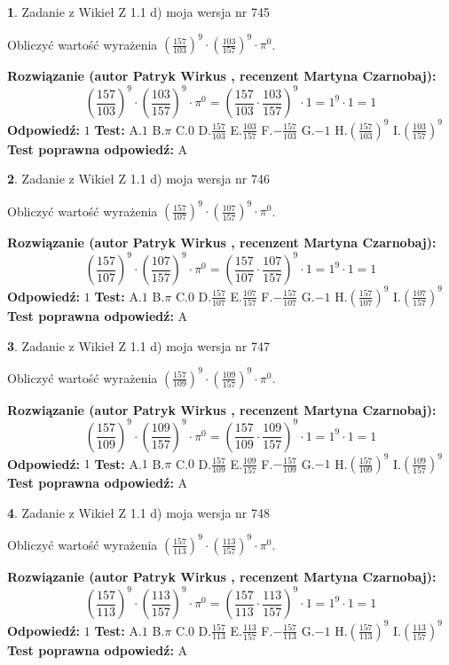 \documentclass[12pt, a4paper]{article}
\theoremstyle{definition} %
\newtheorem{zad}{}
\newcommand{\zadStart}[1]{\begin{zad}#1\newline}
\newcommand{\zadStop}{\end{zad}}
\newcommand{\rozwStart}[2]{\noindent \textbf{Rozwiązanie (autor #1 , recenzent #2): }\newline}
\newcommand{\rozwStop}{\newline}
\newcommand{\odpStart}{\noindent \textbf{Odpowiedź:}\newline}
\newcommand{\odpStop}{\newline}
\newcommand{\testStart}{\noindent \textbf{Test:}\newline}
\newcommand{\testStop}{\newline}
\newcommand{\kluczStart}{\noindent \textbf{Test poprawna odpowiedź:}\newline}
\newcommand{\kluczStop}{\newline}
\begin{document}
\zadStart{Zadanie z Wikieł Z 1.1 d) moja wersja nr 745}

Obliczyć wartość wyrażenia $(\frac{157}{103})^{9} \cdot (\frac{103}{157})^{9} \cdot \pi^{0}$.
\zadStop
\rozwStart{Patryk Wirkus}{Martyna Czarnobaj}
$$(\frac{157}{103})^{9} \cdot (\frac{103}{157})^{9} \cdot \pi^{0} = (\frac{157}{103} \cdot \frac{103}{157})^{9} \cdot 1 = 1^{9} \cdot 1 = 1$$
\rozwStop
\odpStart
$1$
\odpStop
\testStart
A.$1$ B.$\pi$ C.$0$ D.$\frac{157}{103}$ E.$\frac{103}{157}$
F.$-\frac{157}{103}$ G.$-1$
H.$(\frac{157}{103})^{9}$
I.$(\frac{103}{157})^{9}$
\testStop
\kluczStart
A
\kluczStop



\zadStart{Zadanie z Wikieł Z 1.1 d) moja wersja nr 746}

Obliczyć wartość wyrażenia $(\frac{157}{107})^{9} \cdot (\frac{107}{157})^{9} \cdot \pi^{0}$.
\zadStop
\rozwStart{Patryk Wirkus}{Martyna Czarnobaj}
$$(\frac{157}{107})^{9} \cdot (\frac{107}{157})^{9} \cdot \pi^{0} = (\frac{157}{107} \cdot \frac{107}{157})^{9} \cdot 1 = 1^{9} \cdot 1 = 1$$
\rozwStop
\odpStart
$1$
\odpStop
\testStart
A.$1$ B.$\pi$ C.$0$ D.$\frac{157}{107}$ E.$\frac{107}{157}$
F.$-\frac{157}{107}$ G.$-1$
H.$(\frac{157}{107})^{9}$
I.$(\frac{107}{157})^{9}$
\testStop
\kluczStart
A
\kluczStop



\zadStart{Zadanie z Wikieł Z 1.1 d) moja wersja nr 747}

Obliczyć wartość wyrażenia $(\frac{157}{109})^{9} \cdot (\frac{109}{157})^{9} \cdot \pi^{0}$.
\zadStop
\rozwStart{Patryk Wirkus}{Martyna Czarnobaj}
$$(\frac{157}{109})^{9} \cdot (\frac{109}{157})^{9} \cdot \pi^{0} = (\frac{157}{109} \cdot \frac{109}{157})^{9} \cdot 1 = 1^{9} \cdot 1 = 1$$
\rozwStop
\odpStart
$1$
\odpStop
\testStart
A.$1$ B.$\pi$ C.$0$ D.$\frac{157}{109}$ E.$\frac{109}{157}$
F.$-\frac{157}{109}$ G.$-1$
H.$(\frac{157}{109})^{9}$
I.$(\frac{109}{157})^{9}$
\testStop
\kluczStart
A
\kluczStop



\zadStart{Zadanie z Wikieł Z 1.1 d) moja wersja nr 748}

Obliczyć wartość wyrażenia $(\frac{157}{113})^{9} \cdot (\frac{113}{157})^{9} \cdot \pi^{0}$.
\zadStop
\rozwStart{Patryk Wirkus}{Martyna Czarnobaj}
$$(\frac{157}{113})^{9} \cdot (\frac{113}{157})^{9} \cdot \pi^{0} = (\frac{157}{113} \cdot \frac{113}{157})^{9} \cdot 1 = 1^{9} \cdot 1 = 1$$
\rozwStop
\odpStart
$1$
\odpStop
\testStart
A.$1$ B.$\pi$ C.$0$ D.$\frac{157}{113}$ E.$\frac{113}{157}$
F.$-\frac{157}{113}$ G.$-1$
H.$(\frac{157}{113})^{9}$
I.$(\frac{113}{157})^{9}$
\testStop
\kluczStart
A
\kluczStop
\end{document}
